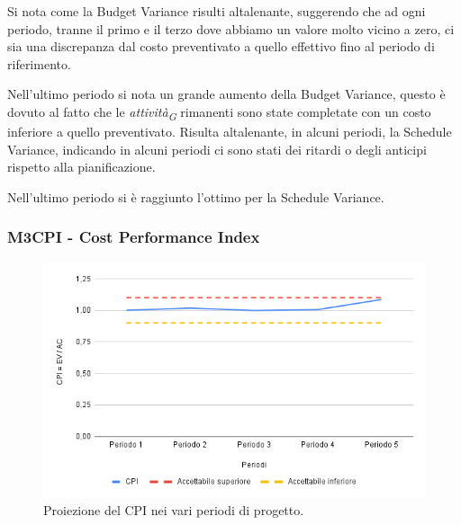 \vspace{0.2cm}

Si nota come la Budget Variance risulti altalenante, suggerendo che ad ogni periodo, tranne il primo e il terzo dove abbiamo un valore molto vicino a zero, ci sia una discrepanza dal costo preventivato a quello effettivo fino al periodo di riferimento. 

\vspace{0.2cm}

Nell'ultimo periodo si nota un grande aumento della Budget Variance, questo è dovuto al fatto che le \textit{attività}\textsubscript{\textit{G}} rimanenti sono state completate con un costo inferiore a quello preventivato. 
Risulta altalenante, in alcuni periodi, la Schedule Variance, indicando in alcuni periodi ci sono stati dei ritardi o degli anticipi rispetto alla pianificazione.

\vspace{0.2cm}

Nell'ultimo periodo si è raggiunto l'ottimo per la Schedule Variance. 

\subsubsection{M3CPI - Cost Performance Index}

\vspace{0.3cm}

\begin{figure}[H]
    \centering
    \includegraphics[width=1\textwidth]{../Images/PianoDiQualifica/M3CPI.png}
    \caption{Proiezione del CPI nei vari periodi di progetto.}
    \label{fig:6}
\end{figure}

\vspace{0.2cm}

